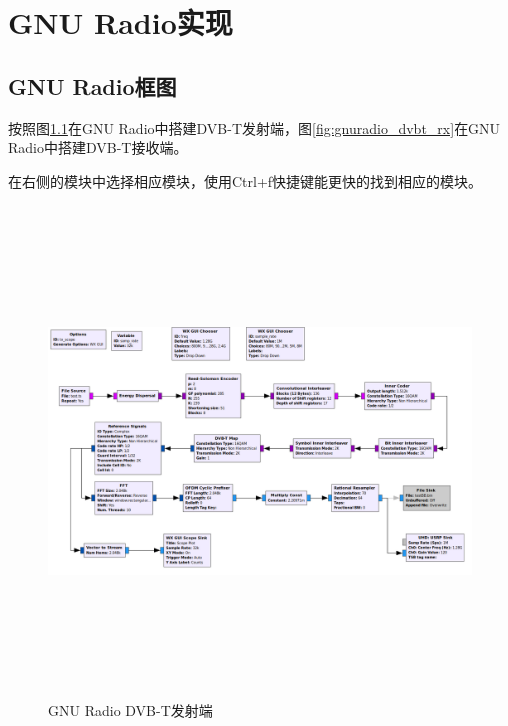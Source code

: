 \chapter{GNU Radio实现}
	\section{GNU Radio框图}
		\par 按照图\ref{fig:gnuradio_dvbt_tx}在GNU Radio中搭建DVB-T发射端，图\ref{fig:gnuradio_dvbt_rx}在GNU Radio中搭建DVB-T接收端。
		\par 在右侧的模块中选择相应模块，使用Ctrl+f快捷键能更快的找到相应的模块。
		\begin{figure}[htbp]
			\centering
			\includegraphics[height=13cm,angle=-90]{figures/dvbt_tx.png}
			\caption{GNU Radio DVB-T发射端}
			\label{fig:gnuradio_dvbt_tx}
		\end{figure}
